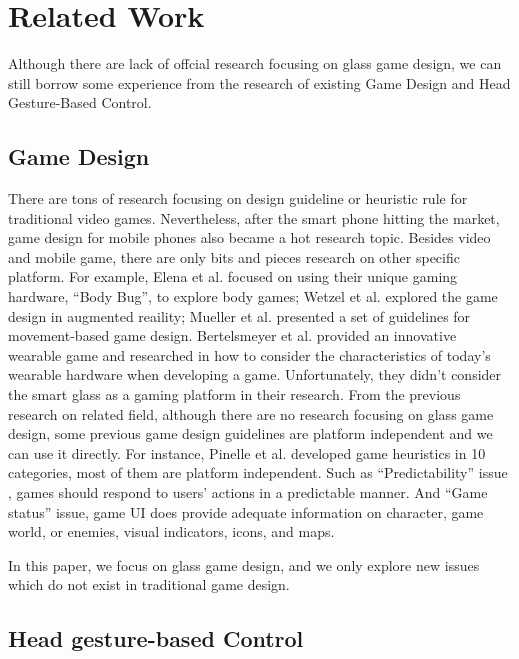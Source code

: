 \section{Related Work}

Although there are lack of offcial research focusing on glass game design, we can still borrow some experience from the research of existing Game Design and Head Gesture-Based Control.

\subsection{Game Design}

There are tons of research focusing on design guideline or heuristic rule for traditional video games\cite{gameflow,criticalreview,chi04game,09game,02game,08game,07game}. Nevertheless, after the smart phone hitting the market, game design for mobile phones also became a hot research topic\cite{mobilegame,mobile06,mobile08,icec06}. Besides video and mobile game, there are only bits and pieces research on other specific platform. For example, Elena et al. focused on using their unique gaming hardware, ``Body Bug'', to explore body games\cite{bodygame}; Wetzel et al. explored the game design in augmented reaility\cite{argame}; Mueller et al. presented a set of guidelines for movement-based game design\cite{movegame}. Bertelsmeyer et al. provided an innovative wearable game and researched in how to consider the characteristics of today's wearable hardware when developing a game\cite{wearable}. Unfortunately, they didn't consider the smart glass as a gaming platform in their research. 
From the previous research on related field, although there are no research focusing on glass game design, some previous game design guidelines are platform independent and we can use it directly. For instance, Pinelle et al.\cite{videogame} developed game heuristics in 10 categories, most of them are platform independent. 
Such as ``Predictability'' issue , games should respond to users' actions in a predictable manner. And ``Game status'' issue, game UI does provide adequate information on character, game world, or enemies, visual indicators, icons, and maps. 

In this paper, we focus on glass game design, and we only explore new issues which do not exist in traditional game design.


\subsection{Head gesture-based Control}


